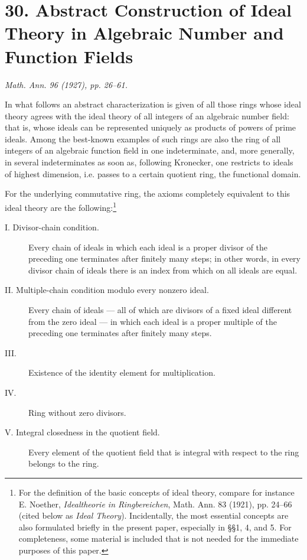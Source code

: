 \documentclass[11pt]{article}
\begin{document}
\section*{30. Abstract Construction of Ideal Theory in Algebraic Number and Function Fields}
\noindent\emph{Math. Ann. 96 (1927), pp. 26--61.}

In what follows an abstract characterization is given of all those rings whose ideal
theory agrees with the ideal theory of all integers of an algebraic number field:
that is, whose ideals can be represented uniquely as products of powers of prime
ideals. Among the best-known examples of such rings are also the ring of all
integers of an algebraic function field in one indeterminate, and, more generally,
in several indeterminates as soon as, following Kronecker, one restricts to ideals
of highest dimension, i.e. passes to a certain quotient ring, the functional domain.

For the underlying commutative ring, the axioms completely equivalent to this ideal
theory are the following:\footnote{For the definition of the basic concepts of ideal
theory, compare for instance E. Noether, \emph{Idealtheorie in Ringbereichen},
Math. Ann. 83 (1921), pp. 24--66 (cited below as \emph{Ideal Theory}). Incidentally,
the most essential concepts are also formulated briefly in the present paper,
especially in §§1, 4, and 5. For completeness, some material is included that is not
needed for the immediate purposes of this paper.}

\begin{description}
\item[I. Divisor-chain condition.] Every chain of ideals in which each ideal is a
proper divisor of the preceding one terminates after finitely many steps; in other
words, in every divisor chain of ideals there is an index from which on all ideals
are equal.
\item[II. Multiple-chain condition modulo every nonzero ideal.] Every chain of ideals
— all of which are divisors of a fixed ideal different from the zero ideal — in which
each ideal is a proper multiple of the preceding one terminates after finitely many
steps.
\item[III.] Existence of the identity element for multiplication.
\item[IV.] Ring without zero divisors.
\item[V. Integral closedness in the quotient field.] Every element of the quotient
field that is integral with respect to the ring belongs to the ring.
\end{description}
\end{document}
